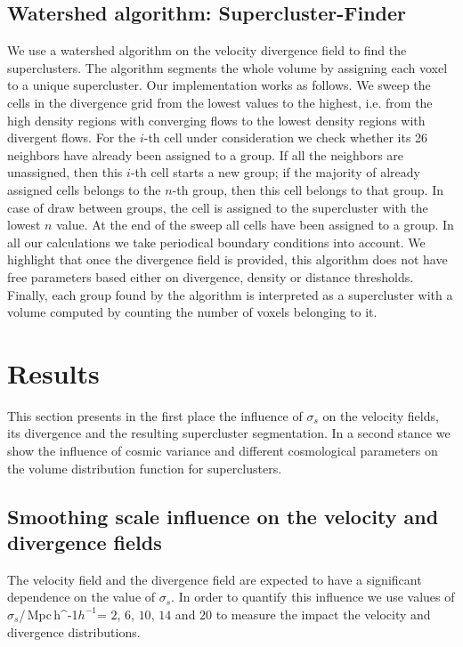 \documentclass[usenatbib]{mnras}
\newcommand{\Mpch}{\,{\rm Mpc}\,\ifmmode h^{-1}\else $h^{-1}$\fi}
\begin{document}
\subsection{Watershed algorithm: Supercluster-Finder}

We use a watershed algorithm \citep{BeucherWatershed1979} on the velocity divergence field to find the
superclusters.
The algorithm segments the whole volume by assigning each voxel to a unique supercluster. 
Our implementation works as follows. 
We sweep the cells in the divergence grid from the lowest values to the highest, i.e. from
the high density regions with converging flows to the lowest density regions with divergent
flows.
For the $i$-th cell under consideration we check whether its 26 neighbors have already been assigned to a group. 
If all the neighbors are unassigned, then this $i$-th cell starts a
new group; if the majority of already assigned cells belongs to the
$n$-th group, then this cell belongs to that group.
In case of draw between groups, the cell is assigned to the supercluster with the lowest $n$ value.
At the end of the sweep all cells have been assigned to a group. 
In all our calculations we take periodical boundary conditions into
account.  
We highlight that once the divergence field is provided, this algorithm
does not have free parameters based either on divergence, density or distance thresholds. 
Finally, each group found by the algorithm is interpreted as a supercluster 
with a volume computed by counting the number of voxels belonging to it.

\section{Results}

This section presents in the first place the influence of $\sigma_s$ on the velocity fields, its divergence and the resulting supercluster segmentation.
In a second stance we show the influence of cosmic variance and different cosmological parameters on the volume distribution function for superclusters.

\subsection{Smoothing scale influence on the velocity and divergence fields}
\label{VDF effects}


The velocity field and the divergence field are expected to have a significant dependence on the value of $\sigma_s$.
In order to quantify this influence we use values of $\sigma_s$/\Mpch = $2$, $6$, $10$, $14$ and $20$
to measure the impact the velocity and divergence distributions.
\end{document}
